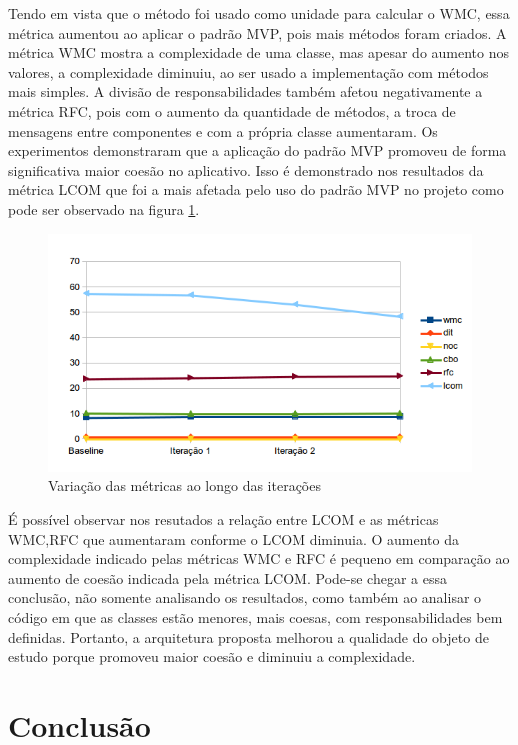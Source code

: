 \documentclass[conference]{IEEEtran}
\begin{document}
Tendo em vista que o método foi usado como unidade para calcular o WMC, essa
métrica aumentou ao aplicar o padrão MVP, pois mais métodos foram criados. A
métrica WMC mostra a complexidade de uma classe, mas apesar do aumento nos
valores, a complexidade diminuiu, ao ser usado a implementação com métodos mais
simples. A divisão de responsabilidades também afetou negativamente a métrica
RFC, pois com o aumento da quantidade de métodos, a troca de mensagens entre
componentes e com a própria classe aumentaram. Os experimentos demonstraram que
a aplicação do padrão MVP promoveu de forma significativa maior coesão no
aplicativo. Isso é demonstrado nos resultados da métrica LCOM que foi a mais
afetada pelo uso do padrão MVP no projeto como pode ser observado na figura
\ref{fig:allmetrics}.

\begin{figure}[htb]
	\includegraphics[scale=0.55]{img/allmetrics}
	\caption{\label{fig:allmetrics} Variação das métricas ao longo das iterações}
\end{figure}


É possível observar nos resutados a relação entre LCOM e as métricas 
WMC,RFC que aumentaram conforme o LCOM diminuia. O aumento da complexidade
indicado pelas métricas WMC e RFC é pequeno em comparação ao aumento de
coesão indicada pela métrica LCOM. Pode-se chegar a essa conclusão, não somente
analisando os resultados, como também ao analisar o código em que as classes
estão menores, mais coesas, com responsabilidades bem definidas. Portanto, a
arquitetura proposta melhorou a qualidade do objeto de estudo porque promoveu
maior coesão e diminuiu a complexidade.

\section{Conclusão} 
\end{document}
